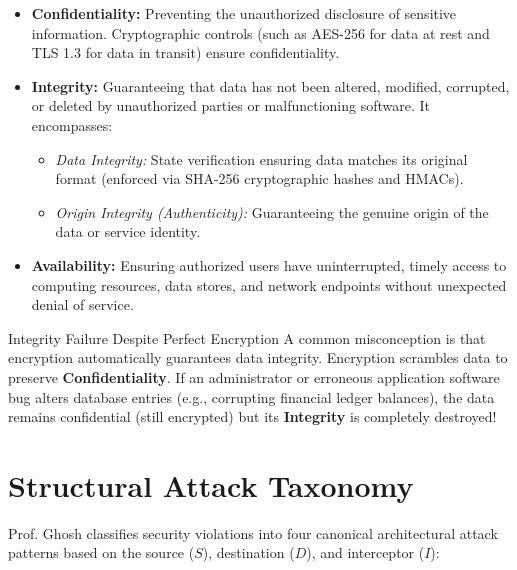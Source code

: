 \begin{itemize}[leftmargin=*]
  \item \textbf{Confidentiality:} Preventing the unauthorized disclosure of sensitive information. Cryptographic controls (such as AES-256 for data at rest and TLS 1.3 for data in transit) ensure confidentiality.
  \item \textbf{Integrity:} Guaranteeing that data has not been altered, modified, corrupted, or deleted by unauthorized parties or malfunctioning software. It encompasses:
    \begin{itemize}
      \item \emph{Data Integrity:} State verification ensuring data matches its original format (enforced via SHA-256 cryptographic hashes and HMACs).
      \item \emph{Origin Integrity (Authenticity):} Guaranteeing the genuine origin of the data or service identity.
    \end{itemize}
  \item \textbf{Availability:} Ensuring authorized users have uninterrupted, timely access to computing resources, data stores, and network endpoints without unexpected denial of service.
\end{itemize}

\begin{warnbox}{Integrity Failure Despite Perfect Encryption}
A common misconception is that encryption automatically guarantees data integrity. Encryption scrambles data to preserve \textbf{Confidentiality}. If an administrator or erroneous application software bug alters database entries (e.g., corrupting financial ledger balances), the data remains confidential (still encrypted) but its \textbf{Integrity} is completely destroyed!
\end{warnbox}

\section{Structural Attack Taxonomy}
Prof. Ghosh classifies security violations into four canonical architectural attack patterns based on the source ($S$), destination ($D$), and interceptor ($I$):

